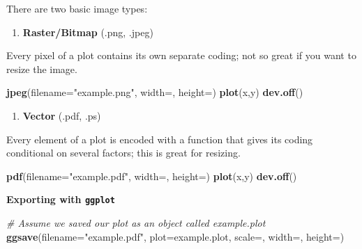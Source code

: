 \documentclass[]{book}
\newenvironment{Shaded}{\begin{snugshade}}{\end{snugshade}}
\newcommand{\KeywordTok}[1]{\textcolor[rgb]{0.13,0.29,0.53}{\textbf{#1}}}
\newcommand{\DataTypeTok}[1]{\textcolor[rgb]{0.13,0.29,0.53}{#1}}
\newcommand{\StringTok}[1]{\textcolor[rgb]{0.31,0.60,0.02}{#1}}
\newcommand{\CommentTok}[1]{\textcolor[rgb]{0.56,0.35,0.01}{\textit{#1}}}
\newcommand{\NormalTok}[1]{#1}
\providecommand{\tightlist}{%
  \setlength{\itemsep}{0pt}\setlength{\parskip}{0pt}}
\begin{document}
There are two basic image types:

\begin{enumerate}
\def\labelenumi{\arabic{enumi})}
\tightlist
\item
  \textbf{Raster/Bitmap} (.png, .jpeg)
\end{enumerate}

Every pixel of a plot contains its own separate coding; not so great if
you want to resize the image.

\begin{Shaded}
\begin{Highlighting}[]
\KeywordTok{jpeg}\NormalTok{(}\DataTypeTok{filename=}\StringTok{"example.png"}\NormalTok{, }\DataTypeTok{width=}\NormalTok{, }\DataTypeTok{height=}\NormalTok{)}
\KeywordTok{plot}\NormalTok{(x,y)}
\KeywordTok{dev.off}\NormalTok{()}
\end{Highlighting}
\end{Shaded}

\begin{enumerate}
\def\labelenumi{\arabic{enumi})}
\setcounter{enumi}{1}
\tightlist
\item
  \textbf{Vector} (.pdf, .ps)
\end{enumerate}

Every element of a plot is encoded with a function that gives its coding
conditional on several factors; this is great for resizing.

\begin{Shaded}
\begin{Highlighting}[]
\KeywordTok{pdf}\NormalTok{(}\DataTypeTok{filename=}\StringTok{"example.pdf"}\NormalTok{, }\DataTypeTok{width=}\NormalTok{, }\DataTypeTok{height=}\NormalTok{)}
\KeywordTok{plot}\NormalTok{(x,y)}
\KeywordTok{dev.off}\NormalTok{()}
\end{Highlighting}
\end{Shaded}

\textbf{Exporting with \texttt{ggplot}}

\begin{Shaded}
\begin{Highlighting}[]
\CommentTok{# Assume we saved our plot as an object called example.plot}
\KeywordTok{ggsave}\NormalTok{(}\DataTypeTok{filename=}\StringTok{"example.pdf"}\NormalTok{, }\DataTypeTok{plot=}\NormalTok{example.plot, }\DataTypeTok{scale=}\NormalTok{, }\DataTypeTok{width=}\NormalTok{, }\DataTypeTok{height=}\NormalTok{)}
\end{Highlighting}
\end{Shaded}
\end{document}
